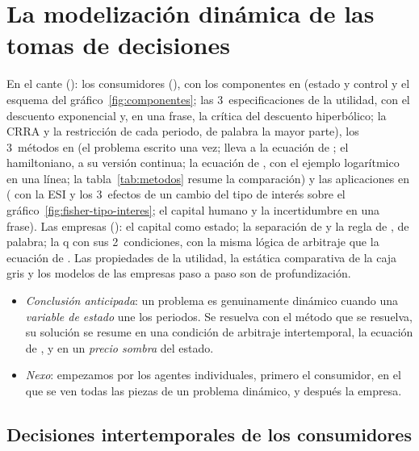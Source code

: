 \documentclass[11pt]{article}
\begin{document}
\section{La modelización dinámica de las tomas de decisiones}\label{sec:micro}

\begin{notaopositor}
En el cante (): los consumidores (), con los componentes en  (estado y control y el esquema del gráfico~\ref{fig:componentes}; las 3~especificaciones de la utilidad, con el descuento exponencial y, en una frase, la crítica del descuento hiperbólico; la CRRA y la restricción de cada periodo, de palabra la mayor parte), los 3~métodos en  (el problema escrito una vez;  lleva a la ecuación de ; el hamiltoniano, a su versión continua; la ecuación de , con el ejemplo logarítmico en una línea; la tabla~\ref{tab:metodos} resume la comparación) y las aplicaciones en  ( con la ESI y los 3~efectos de un cambio del tipo de interés sobre el gráfico~\ref{fig:fisher-tipo-interes}; el capital humano y la incertidumbre en una frase). Las empresas (): el capital como estado; la separación de  y la regla de , de palabra; la q con sus 2~condiciones, con la misma lógica de arbitraje que la ecuación de . Las propiedades de la utilidad, la estática comparativa de la caja gris y los modelos de las empresas paso a paso son de profundización.
\end{notaopositor}

\begin{itemize}
\item \emph{Conclusión anticipada}: un problema es genuinamente dinámico cuando una \emph{variable de estado} une los periodos. Se resuelva con el método que se resuelva, su solución se resume en una condición de arbitraje intertemporal, la ecuación de , y en un \emph{precio sombra} del estado.
\item \emph{Nexo}: empezamos por los agentes individuales, primero el consumidor, en el que se ven todas las piezas de un problema dinámico, y después la empresa.
\end{itemize}

\subsection{Decisiones intertemporales de los consumidores}\label{sec:consumidores}
\end{document}
